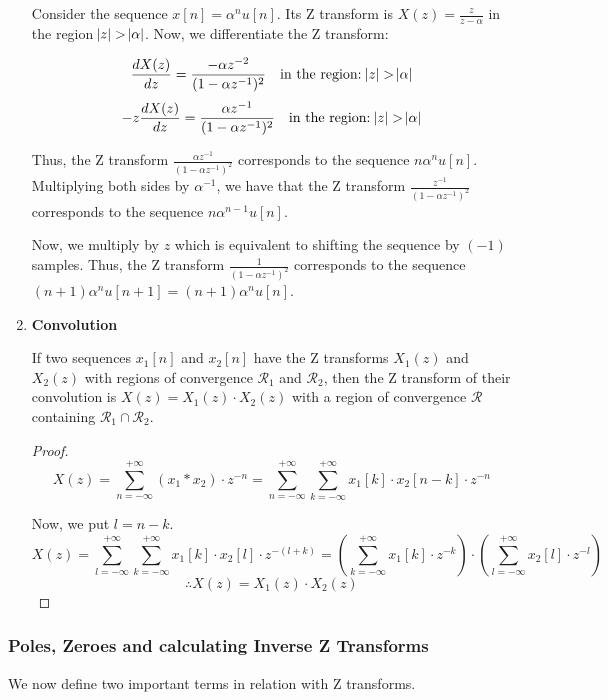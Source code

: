 \documentclass{article}
\theoremstyle{definition}
\begin{document}
\begin{enumerate}
Consider the sequence $x[n] = \alpha^n u[n]$. Its Z transform is $X(z) = \frac{z}{z-\alpha}$ in the region $\abs{z} > \abs{\alpha}$. Now, we differentiate the Z transform:

\[
	\frac{dX(z)}{dz} = \frac{-\alpha z^{-2}}{(1-\alpha z^{-1})^2} \quad \text{in the region:} \: \abs{z} > \abs{\alpha} 
\]
\[
	-z \frac{dX(z)}{dz} = \frac{\alpha z^{-1}}{(1-\alpha z^{-1})^2} \quad \text{in the region:} \: \abs{z} > \abs{\alpha} 
\]

Thus, the Z transform $\frac{\alpha z^{-1}}{(1-\alpha z^{-1})^2}$ corresponds to the sequence $n \alpha^n u[n]$. Multiplying both sides by $\alpha^{-1}$, we have that the Z transform $\frac{z^{-1}}{(1-\alpha z^{-1})^2}$ corresponds to the sequence $n \alpha^{n-1} u[n]$. \smallskip

Now, we multiply by $z$ which is equivalent to shifting the sequence by $(-1)$ samples. Thus, the Z transform $\frac{1}{(1-\alpha z^{-1})^2}$ corresponds to the sequence $(n+1)\alpha^n u[n+1] = (n+1) \alpha^n u[n]$.

\item \textbf{Convolution}

If two sequences $x_1[n]$ and $x_2[n]$ have the Z transforms $X_1(z)$ and $X_2(z)$ with regions of convergence $\mathcal{R}_1$ and $\mathcal{R}_2$, then the Z transform of their convolution is $X(z) = X_1(z) \cdot X_2(z)$ with a region of convergence $\mathcal{R}$ containing $\mathcal{R}_1 \cap \mathcal{R}_2$.
\begin{proof}
\[
	X(z) = \sum_{n=-\infty}^{+\infty} (x_1 * x_2) \cdot z^{-n} = \sum_{n=-\infty}^{+\infty} \sum_{k=-\infty}^{+\infty} x_1[k] \cdot x_2[n-k] \cdot z^{-n} 
\]

Now, we put $l = n-k$. 
\[
	X(z) = \sum_{l=-\infty}^{+\infty} \sum_{k=-\infty}^{+\infty} x_1[k] \cdot x_2[l] \cdot z^{-(l+k)} = \left( \sum_{k=-\infty}^{+\infty} x_1[k] \cdot z^{-k} \right) \cdot \left( \sum_{l=-\infty}^{+\infty} x_2[l] \cdot z^{-l} \right)
\] 
\[
	\therefore \boxed{X(z) = X_1(z) \cdot X_2(z)}
\]
\end{proof}
\end{enumerate}

\subsubsection{Poles, Zeroes and calculating Inverse Z Transforms}

We now define two important terms in relation with Z transforms. \smallskip
\end{document}
